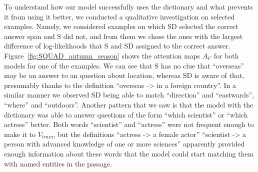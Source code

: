 To understand how our model successfully uses the dictionary and what prevents it from using it better, we conducted a qualitative investigation on selected examples. Namely, we considered examples on which SD selected the correct answer span and S did not, and from them we chose the ones with the largest difference of log-likelihoods that S and SD assigned to the correct answer. Figure~\ref{fig:SQUAD_autumn_season} shows the attention maps $A_C$ for both models for one of the examples. We can see that S has no clue that ``overseas'' may be an answer to an question about location, whereas SD is aware of that, presumably thanks to the definition ``overseas -> in a foreign country''. In a similar manner we observed SD being able to match ``direction'' and ``eastwards'', ``where'' and ``outdoors''. Another pattern that we saw is that the model with the dictionary was able to answer questions of the form ``which scientist'' or ``which actress'' better. Both words ``scientist'' and ``actress'' were not frequent enough to make it to $V_{train}$, but the definitions ``actress -> a female actor'' ``scientist -> a person with advanced knowledge of one or more sciences'' apparently provided enough information about these words that the model could start matching them with named entities in the passage. 


